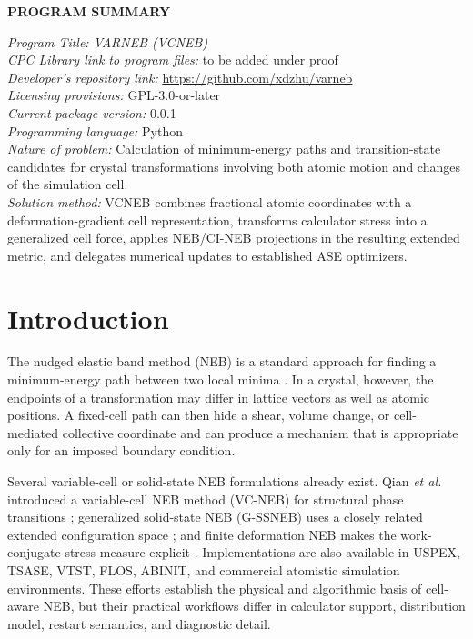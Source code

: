 \documentclass[final,3p,times]{elsarticle}
\begin{document}
{\bf PROGRAM SUMMARY}
\begin{small}
\noindent
{\em Program Title: VARNEB (VCNEB)} \\
{\em CPC Library link to program files:} to be added under proof \\
{\em Developer's repository link:} \url{https://github.com/xdzhu/varneb} \\
{\em Licensing provisions:} GPL-3.0-or-later \\
{\em Current package version:} 0.0.1 \\
{\em Programming language:} Python \\
{\em Nature of problem:} Calculation of minimum-energy paths and transition-state candidates for crystal transformations involving both atomic motion and changes of the simulation cell. \\
{\em Solution method:} VCNEB combines fractional atomic coordinates with a deformation-gradient cell representation, transforms calculator stress into a generalized cell force, applies NEB/CI-NEB projections in the resulting extended metric, and delegates numerical updates to established ASE optimizers. \\
\end{small}

\section{Introduction}
\label{sec:introduction}

The nudged elastic band method (NEB) is a standard approach for finding a
minimum-energy path between two local minima \cite{Henkelman2000}.  In a
crystal, however, the endpoints of a transformation may differ in lattice
vectors as well as atomic positions.  A fixed-cell path can then hide a shear,
volume change, or cell-mediated collective coordinate and can produce a
mechanism that is appropriate only for an imposed boundary condition.

Several variable-cell or solid-state NEB formulations already exist.  Qian
\emph{et al.} introduced a variable-cell NEB method (VC-NEB) for structural
phase transitions \cite{Qian2013}; generalized solid-state NEB (G-SSNEB) uses a
closely related extended configuration space \cite{Sheppard2012}; and finite
deformation NEB makes the work-conjugate stress measure explicit
\cite{Ghasemi2019}.  Implementations are also available in USPEX, TSASE,
VTST, FLOS, ABINIT, and commercial atomistic simulation environments.  These
efforts establish the physical and algorithmic basis of cell-aware NEB, but
their practical workflows differ in calculator support, distribution model,
restart semantics, and diagnostic detail.
\end{document}
